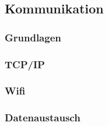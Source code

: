 \subsection{Kommunikation} %

\subsubsection{Grundlagen}
\subsubsection{TCP/IP}
\subsubsection{Wifi}
\subsubsection{Datenaustausch} %